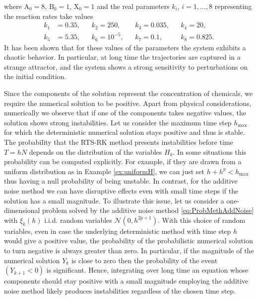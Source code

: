 \documentclass{siamart1116}
\numberwithin{theorem}{section}
\begin{document}
where $\mathrm{A}_0 = 8$, $\mathrm{B}_0 = 1$, $\mathrm{X}_0 = 1$ and the real parameters $k_i$, $i = 1, \ldots, 8$ representing the reaction rates take values
\begin{equation}
\begin{aligned}
k_1 &= 0.35, &&k_2 = 250, &&k_3 = 0.035, &&k_4 = 20,\\
k_5 &= 5.35, &&k_6 = 10^{-5}, &&k_7 = 0.1, &&k_8 = 0.825.
\end{aligned}
\end{equation}            
It has been shown \cite{Ols83} that for these values of the parameters the system exhibits a chaotic behavior. In particular, at long time the trajectories are captured in a strange attractor, and the system shows a strong sensitivity to perturbations on the initial condition. 

Since the components of the solution represent the concentration of chemicals, we require the numerical solution to be positive. Apart from physical considerations, numerically we observe that if one of the components takes negative values, the solution shows strong instabilities. Let us consider the maximum time step $h_{\max}$ for which the deterministic numerical solution stays positive and thus is stable. The probability that the RTS-RK method presents instabilities before time $T = hN$ depends on the distribution of the variables $H_k$. In some situations this probability can be computed explicitly. For example, if they are drawn from a uniform distribution as in Example \ref{ex:uniformH}, we can just set $h + h^p < h_{\max}$ thus having a null probability of being unstable. In contrast, for the additive noise method we can have disruptive effects even with small time steps if the solution has a small magnitude. To illustrate this issue, let us consider a one-dimensional problem solved by the additive noise method \eqref{eq:ProbMethAddNoise} with $\xi_k(h)$ i.i.d. random variables $\mathcal{N}(0, h^{2p + 1})$. With this choice of random variables, even in case the underlying deterministic method with time step $h$ would give a positive value, the probability of the probabilistic numerical solution to turn negative is always greater than zero. In particular, if the magnitude of the numerical solution $Y_k$ is close to zero then the probability of the event $(Y_{k+1} < 0)$ is significant. Hence, integrating over long time an equation whose components should stay positive with a small magnitude employing the additive noise method likely produces instabilities regardless of the chosen time step.
\end{document}
